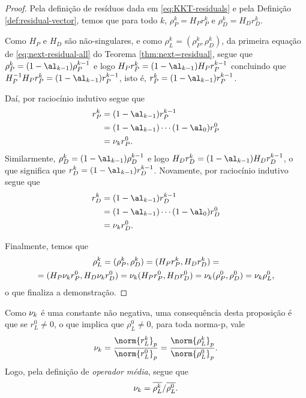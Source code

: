 \begin{proof}
	Pela definição de resíduos  dada em \eqref{eq:KKT-residuals}   e pela Definição \ref{def:residual-vector}, temos que para todo $k$, $\rho_{P}^{k} = H_{P}r_{P}^{k} $ e  $\rho_{D}^{k} = H_{D}r_{D}^{k} $. 

	Como $H_{P}$ e $H_{D}$ são não-singulares, e como $\rho_L^{k} = (\rho_P^{k},\rho_D^{k})$,  da primeira equação de \eqref{eq:next-residual-all} do Teorema \ref{thm:next=residual}, segue que $\rho_P^{k}  = (1-\al_{k-1})\rho_P^{k-1}$ e logo $
			H_{P}r_{P}^{k}  = (1-\al_{k-1})H_{P}r_{P}^{k-1}$ concluindo que  
		$H_{P}^{-1}H_{P}r_{P}^{k}  = (1-\al_{k-1})r_{P}^{k-1}$, isto é, $r_{P}^{k}  = (1-\al_{k-1})r_{P}^{k-1}$.

	Daí, por raciocínio indutivo segue que 
	\[
	\begin{aligned}
		r_{P}^{k} & = (1-\al_{k-1})r_{P}^{k-1} \\
	  			   & = (1-\al_{k-1})\cdots(1-\al_{0})r_{P}^{0}\\
				   & = \nuk r_{P}^{0}. 
	\end{aligned}
	\]
Similarmente,  $\rho_D^{k}  = (1-\al_{k-1})\rho_D^{k-1}$ e logo $
			H_{D}r_{D}^{k}  = (1-\al_{k-1})H_{D}r_{D}^{k-1}$, o que significa que   $r_{D}^{k}  = (1-\al_{k-1})r_{D}^{k-1}$. Novamente,  por raciocínio indutivo segue que 
	\[
	\begin{aligned}
		r_{D}^{k} & = (1-\al_{k -1})r_{D}^{k-1} \\
	  			   & = (1-\al_{k -1})\cdots(1-\al_{0})r_{D}^{0}\\
				   & = \nuk   r_{D}^{0}. 
	\end{aligned}
	\]

	Finalmente, temos que 
	\begin{multline*}
	\rho_L^{k} = (\rho_P^{k},\rho_D^{k}) = (H_{P}r_P^{k},H_{D}r_D^{k}) =\\ = (H_{P}\nu_{k} r_{P}^{0},H_{D}\nu_{k} r_{D}^{0})  
	= \nu_{k} (H_{P}r_{P}^{0},H_{D} r_{D}^{0}) =\nu_{k} (\rho_P^{0},\rho_D^{0}) = \nu_{k}  \rho_L^{0},
		\end{multline*}	
		o 	que finaliza a demonstração.
\end{proof}

Como  $\nu_{k} $ é uma constante não negativa,  uma consequência desta proposição é que se $r_L^0\neq 0 $, o que implica que $\rho_L^0\neq 0 $, para toda norma-p, vale 
\[
\nuk  =\frac{\norm{r_L^{k}}_p}{\norm{r_L^{0}}_p} = \frac{\norm{\rho_L^{k}}_p}{\norm{\rho_L^{0}}_p}.
\]
Logo, pela definição de \emph{operador média}, segue que
\begin{equation}
	\label{eq:nu_k}
	\nu_{k}  = {\overline{\rho_L^k}}/{\overline{\rho_L^0}}.
\end{equation}

